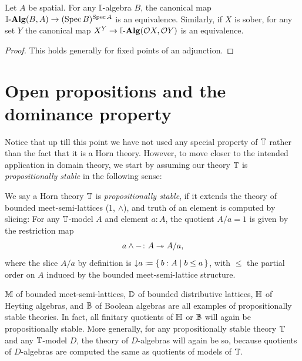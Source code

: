 \begin{proposition}\label{prop:duality}
  Let $A$ be spatial. For any $\mathbb{I}$-algebra $B$, the canonical map $\I\alg(B,A) \to (\spec B)^{\spec A}$ is an equivalence. Similarly, if $X$ is sober, for any set $Y$ the canonical map $X^Y \to \I\alg(\opens X,\opens Y)$ is an equivalence.
\end{proposition}
\begin{proof}
  This holds generally for fixed points of an adjunction.
\end{proof}

\section{Open propositions and the dominance property}\label{sec:dominance}

Notice that up till this point we have not used any special property of $\mathbb{T}$ rather than the fact that it is a Horn theory. However, to move closer to the intended application in domain theory, we start by assuming our theory $\mathbb{T}$ is \emph{propositionally stable} in the following sense: 

\begin{definition}\label{defn:propositional}
  We say a Horn theory $\mathbb{T}$ is \emph{propositionally stable}, if it extends the theory of bounded meet-semi-lattices (1, $\wedge$), and truth of an element is computed by slicing: For any $\mathbb{T}$-model $A$ and element $a:A$, the quotient $A/a=1$ is given by the restriction map
  \[ {a \wedge -} \colon A \surj A/a\text{,} \]
  where the slice $A/a$ by definition is ${\operatorname{\downarrow}} a \coloneq \{\,b:A\mid b\le a\,\}$, with $\le$ the partial order on $A$ induced by the bounded meet-semi-lattice structure.
\end{definition}

\begin{remark}
  $\mathbb{M}$ of bounded meet-semi-lattices, $\mathbb{D}$ of bounded distributive lattices, $\mathbb{H}$ of Heyting algebras, and $\mathbb{B}$ of Boolean algebras are all examples of propositionally stable theories. In fact, all finitary quotients of $\mathbb{H}$ or $\mathbb{B}$ will again be propositionally stable. More generally, for any propositionally stable theory $\mathbb{T}$ and any $\mathbb{T}$-model $D$, the theory of $D$-algebras will again be so, because quotients of $D$-algebras are computed the same as quotients of models of $\mathbb{T}$.
\end{remark}

